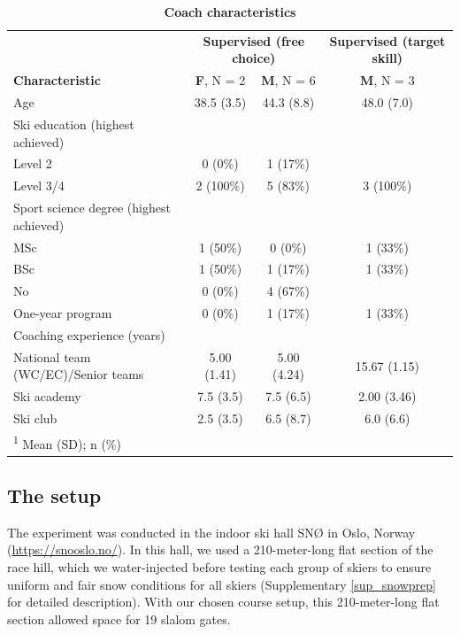 \documentclass[pdflatex,sn-mathphys-num]{sn-jnl}%
\theoremstyle{thmstyleone}%
\theoremstyle{thmstyletwo}%
\theoremstyle{thmstylethree}%
\begin{document}
\begin{table}\label{descriptive_coach}
\caption{\textbf{Coach characteristics}}
\centering
\begin{tabular}[H]{l|c|c|c}
\hline
\multicolumn{1}{c|}{ } & \multicolumn{2}{c|}{\textbf{Supervised (free choice)}} & \multicolumn{1}{c}{\textbf{Supervised (target skill)}} \\
\textbf{Characteristic} & \textbf{F}, N = 2 & \textbf{M}, N = 6 & \textbf{M}, N = 3\\
\hline
Age & 38.5 (3.5) & 44.3 (8.8) & 48.0 (7.0)\\
\hline
Ski education (highest achieved) &  &  & \\
\hline
\hspace{1em}Level 2 & 0 (0\%) & 1 (17\%) & \\
\hline
\hspace{1em}Level 3/4 & 2 (100\%) & 5 (83\%) & 3 (100\%)\\
\hline
Sport science degree (highest achieved) &  &  & \\
\hline
\hspace{1em}MSc & 1 (50\%) & 0 (0\%) & 1 (33\%)\\
\hline
\hspace{1em}BSc & 1 (50\%) & 1 (17\%) & 1 (33\%)\\
\hline
\hspace{1em}No & 0 (0\%) & 4 (67\%) & \\
\hline
\hspace{1em}One-year program & 0 (0\%) & 1 (17\%) & 1 (33\%)\\
\hline
Coaching experience (years) &  &  & \\
\hline
\hspace{1em}National team (WC/EC)/Senior teams & 5.00 (1.41) & 5.00 (4.24) & 15.67 (1.15)\\
\hline
\hspace{1em}Ski academy & 7.5 (3.5) & 7.5 (6.5) & 2.00 (3.46)\\
\hline
\hspace{1em}Ski club & 2.5 (3.5) & 6.5 (8.7) & 6.0 (6.6)\\
\hline
\multicolumn{4}{l}{\rule{0pt}{1em}\textsuperscript{1} Mean (SD); n (\%)}\\
\end{tabular}
\end{table} 


\subsection{The setup}
The experiment was conducted in the indoor ski hall SNØ in Oslo, Norway (\url{https://snooslo.no/}). In this hall, we used a 210-meter-long flat section of the race hill, which we water-injected before testing each group of skiers to ensure uniform and fair snow conditions for all skiers (Supplementary \ref{sup_snowprep} for detailed description). With our chosen course setup, this 210-meter-long flat section allowed space for 19 slalom gates. 
\end{document}
